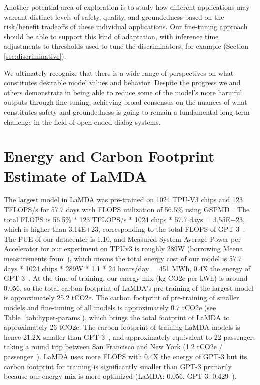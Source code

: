 Another potential area of exploration is to study how different applications may warrant distinct levels of safety, quality, and groundedness based on the risk/benefit tradeoffs of these individual applications. Our fine-tuning approach should be able to support this kind of adaptation, with inference time adjustments to thresholds used to tune the discriminators, for example (Section \ref{sec:discriminative}).

We ultimately recognize that there is a wide range of perspectives on what constitutes desirable model values and behavior. Despite the progress we and others demonstrate in being able to reduce some of the model’s more harmful outputs through fine-tuning, achieving broad consensus on the nuances of what constitutes safety and groundedness is going to remain a fundamental long-term challenge in the field of open-ended dialog systems.

\section{Energy and Carbon Footprint Estimate of LaMDA}
\label{sec:co2-footprint}

The largest model in LaMDA was pre-trained on 1024 TPU-V3 chips and 123 TFLOPS/s for 57.7 days with FLOPS utilization of 56.5\% using GSPMD~\cite{gspmd21}. The total FLOPS is 56.5\% * 123 TFLOPS/s * 1024 chips * 57.7 days  = 3.55E+23, which is  higher than 3.14E+23, corresponding to the total FLOPS of GPT-3~\cite{gpt320}. The PUE of our datacenter is 1.10, and Measured System Average Power per Accelerator for our experiment on TPUv3 is roughly 289W (borrowing Meena measurements from~\cite{patterson2021carbon}),  which means the total energy cost of our model is 57.7 days * 1024 chips * 289W * 1.1 * 24 hours/day = 451 MWh, 0.4X the energy of GPT-3~\cite{gpt320,patterson2021carbon}. At the time of training, our energy mix (kg CO2e per kWh) is around 0.056, so the total carbon footprint of LaMDA's pre-training of the largest model is approximately 25.2 tCO2e. The carbon footprint of pre-training of smaller models and fine-tuning of all models is approximately 0.7 tCO2e (see Table~\ref{tab:hyper-params}),
 which brings the total footprint of LaMDA to approximately 26 tCO2e. The carbon footprint of training LaMDA models is hence 21.2X smaller than GPT-3~\cite{patterson2021carbon}, and approximately equivalent to 22 passengers taking a round trip between San Francisco and New York (1.2 tCO2e / passenger~\cite{patterson2021carbon}). LaMDA uses more FLOPS with 0.4X the energy of GPT-3 but its carbon footprint for training is significantly smaller than GPT-3 primarily because our energy mix is more optimized (LaMDA: 0.056, GPT-3: 0.429~\cite{patterson2021carbon}). 

